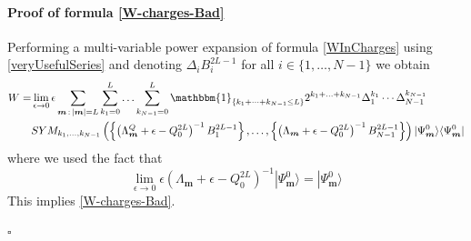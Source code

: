 \documentclass[10pt]{article}
\numberwithin{equation}{section}
\numberwithin{equation}{subsection}
\begin{document}
\paragraph{Proof of formula \eqref{W-charges-Bad}}
Performing a multi-variable power expansion of formula \eqref{WInCharges} using \eqref{veryUsefulSeries} and denoting $\Delta_{i} B_{i}^{2L-1}$ for all $i\in\{1,\ldots,N-1\}$  we obtain 
\begin{equation}
	\begin{split}
		W=&\lim_{\epsilon\to 0}\epsilon\sum_{\bm{m}\,:\,|\bm{m}|=L}\sum_{k_{1}=0}^{L}\ldots\sum_{k_{N-1}=0}^{L}\mathbbm{1}_{\{k_{1}+\cdots+k_{N-1}\leq L\}}2^{k_{1}+\ldots+k_{N-1}}\Delta_{1}^{k_{1}}\cdots\Delta_{N-1}^{k_{N-1}}\\&SYM_{k_{1},\ldots,k_{N-1}}\left(\left\{\left(\Lambda_{\bm{m}}^{Q}+\epsilon-Q_{0}^{2L}\right)^{-1}B_{1}^{2L-1}\right\},\ldots,\left\{\left(\Lambda_{\bm{m}}+\epsilon-Q_{0}^{2L}\right)^{-1}B_{N-1}^{2L-1}\right\}\right)|\Psi_{\bm{m}}^{0}\rangle \langle \Psi_{\bm{m}}^{0}|
	\end{split}
\end{equation} 
where we used the fact that 
\begin{equation}
	\lim_{\epsilon\to 0}	\epsilon\left(\Lambda_{\bm{m}}+\epsilon-Q_{0}^{2L}\right)^{-1}|\Psi_{\bm{m}}^{0}\rangle=|\Psi_{\bm{m}}^{0}\rangle
\end{equation}
This implies \eqref{W-charges-Bad}. 
\begin{flushright}
	$\square$
\end{flushright}
\end{document}

